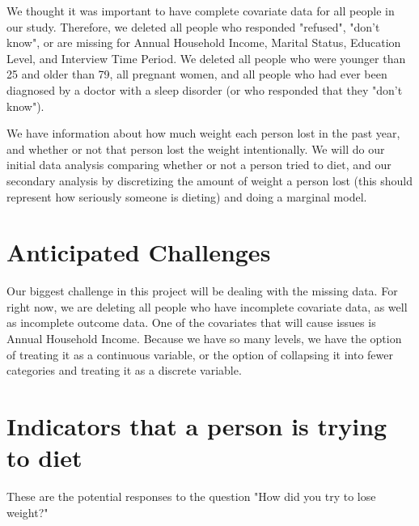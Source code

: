 \documentclass{article}
\begin{document}
We thought it was important to have complete covariate data for all people in our study.  Therefore, we deleted all people who responded "refused", "don't know", or are missing for Annual Household Income, Marital Status, Education Level, and Interview Time Period.  We deleted all people who were younger than 25 and older than 79, all pregnant women, and all people who had ever been diagnosed by a doctor with a sleep disorder (or who responded that they "don't know").  

We have information about how much weight each person lost in the past year, and whether or not that person lost the weight intentionally.  We will do our initial data analysis comparing whether or not a person tried to diet, and our secondary analysis by discretizing the amount of weight a person lost (this should represent how seriously someone is dieting) and doing a marginal model.  

\section{Anticipated Challenges}

Our biggest challenge in this project will be dealing with the missing data.  For right now, we are deleting all people who have incomplete covariate data, as well as incomplete outcome data.  One of the covariates that will cause issues is Annual Household Income.  Because we have so many levels, we have the option of treating it as a continuous variable, or the option of collapsing it into fewer categories and treating it as a discrete variable.  

\section{Indicators that a person is trying to diet}

These are the potential responses to the question "How did you try to lose weight?"
\end{document}

